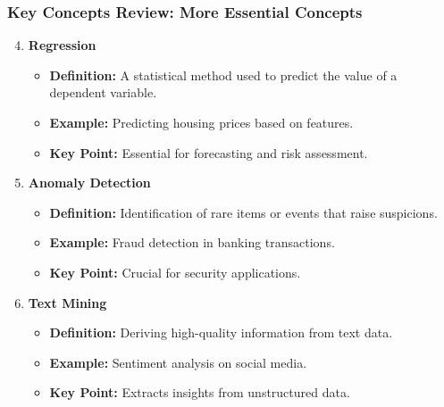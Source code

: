 \documentclass[aspectratio=169]{beamer}
\begin{document}
\begin{frame}[fragile]
  \frametitle{Key Concepts Review: More Essential Concepts}
  \begin{enumerate}
    \setcounter{enumi}{3} %
    \item \textbf{Regression}
      \begin{itemize}
        \item \textbf{Definition:} A statistical method used to predict the value of a dependent variable.
        \item \textbf{Example:} Predicting housing prices based on features.
        \item \textbf{Key Point:} Essential for forecasting and risk assessment.
      \end{itemize}
      
    \item \textbf{Anomaly Detection}
      \begin{itemize}
        \item \textbf{Definition:} Identification of rare items or events that raise suspicions.
        \item \textbf{Example:} Fraud detection in banking transactions.
        \item \textbf{Key Point:} Crucial for security applications.
      \end{itemize}
      
    \item \textbf{Text Mining}
      \begin{itemize}
        \item \textbf{Definition:} Deriving high-quality information from text data.
        \item \textbf{Example:} Sentiment analysis on social media.
        \item \textbf{Key Point:} Extracts insights from unstructured data.
      \end{itemize}
  \end{enumerate}
\end{frame}
\end{document}
